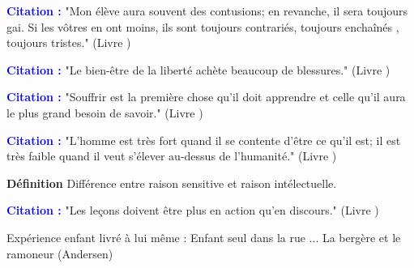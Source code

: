 \documentclass[a4paper, 11pt, hidelinks]{article}
\newcommand{\de}{\large \textbf{Définition} \large }
\newcommand{\cit}{\large \textcolor{blue}{\textbf{Citation :}} \large }
\newcommand{\rb}[1]{\Romanbar{#1}}
\begin{document}
\cit "Mon élève aura souvent des contusions; en revanche, il sera toujours gai. Si les vôtres en ont moins, ils sont toujours contrariés, toujours enchaînés , toujours tristes." (Livre \rb{2})

\cit "Le bien-être de la liberté achète beaucoup de blessures." (Livre \rb{2})


\cit "Souffrir est la première chose qu'il doit apprendre et celle qu'il aura le plus grand besoin de savoir." (Livre \rb{2})


\cit "L'homme est très fort quand il se contente d'être ce qu'il est; il est très faible quand il veut s'élever au-dessus de l'humanité." (Livre \rb{2})


\de Différence entre raison sensitive et raison intélectuelle.


\cit "Les leçons doivent être plus en action qu'en discours." (Livre \rb{2})


Expérience enfant livré à lui même : Enfant seul dans la rue ... La bergère et le ramoneur (Andersen)
\end{document}
